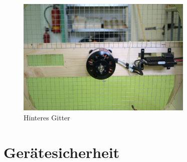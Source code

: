 \begin{figure}[H]
    \centering
    \includegraphics[width=0.75\textwidth]{Fotos/Konstruktion/DSC_8776_gitter_hinten.png}
    \caption{Hinteres Gitter}    
\end{figure}


\section{Gerätesicherheit \label{sec:Geraetesicherheit}}

